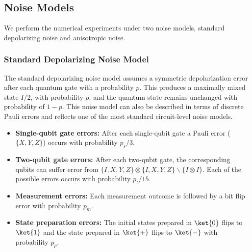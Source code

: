 \documentclass[reprint, amsmath,amssymb, aps,pra,
 floatfix,
]{revtex4-2}
\begin{document}
\subsection{Noise Models}
\noindent We perform the numerical experiments under two noise models, standard depolarizing noise and anisotropic noise.
\subsubsection{Standard Depolarizing Noise Model}
\noindent The standard depolarizing noise model assumes a symmetric depolarization error after each quantum gate with a probability $p$.
This produces a maximally mixed state $I/2$, with probability $p$, and the quantum state remains unchanged with probability of $1-p$.
This noise model can also be described in terms of discrete Pauli errors and reflects one of the most standard circuit-level noise models.
\begin{itemize}
    \item \textbf{Single-qubit gate errors:} After each single-qubit gate a Pauli error ($\{X, Y, Z\}$) occurs with probability $p_{s}/3$. 
    \item \textbf{Two-qubit gate errors:} After each two-qubit gate, the corresponding qubits can suffer error from $\{I, X, Y, Z\}\otimes \{I, X, Y, Z\}\backslash\{I\otimes I\}$.
    Each of the possible errors occurs with probability $p_t/15$.
    \item \textbf{Measurement errors:}
    Each measurement outcome is followed by a bit flip error with probability $p_{m}$.
     \item \textbf{State preparation errors:} The initial states prepared in $\ket{0}$ flips to $\ket{1}$ and the state prepared in $\ket{+}$ flips to $\ket{-}$ with probability $p_{p}$.
\end{itemize}
\end{document}
